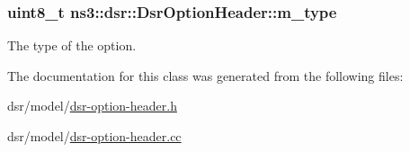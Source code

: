 \subsubsection[{\texorpdfstring{m\+\_\+type}{m_type}}]{\setlength{\rightskip}{0pt plus 5cm}uint8\+\_\+t ns3\+::dsr\+::\+Dsr\+Option\+Header\+::m\+\_\+type\hspace{0.3cm}{\ttfamily [private]}}\hypertarget{classns3_1_1dsr_1_1DsrOptionHeader_a6cd1d1f710ffd6cdfc2774b734b3c65e}{}\label{classns3_1_1dsr_1_1DsrOptionHeader_a6cd1d1f710ffd6cdfc2774b734b3c65e}


The type of the option. 



The documentation for this class was generated from the following files\+:\begin{DoxyCompactItemize}
\item 
dsr/model/\hyperlink{dsr-option-header_8h}{dsr-\/option-\/header.\+h}\item 
dsr/model/\hyperlink{dsr-option-header_8cc}{dsr-\/option-\/header.\+cc}\end{DoxyCompactItemize}
